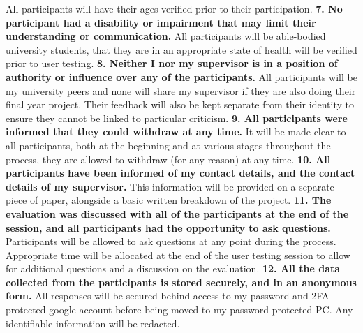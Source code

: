 \documentclass{report}
\begin{document}
\begin{raggedright}
\newline
\newline
All participants will have their ages verified prior to their participation.
\newline
\newline
\textbf{7. No participant had a disability or impairment that may limit their understanding
or communication.}
\newline
\newline
All participants will be able-bodied university students, that they are in an appropriate state of health will be verified prior to user testing.
\newline
\newline
\textbf{8. Neither I nor my supervisor is in a position of authority or influence over any of
the participants.}
\newline
\newline
All participants will be my university peers and none will share my supervisor if they are also doing their final year project. Their feedback will also be kept separate from their identity to ensure they cannot be linked to particular criticism.
\newline
\newline
\textbf{9. All participants were informed that they could withdraw at any time.}
\newline
\newline
It will be made clear to all participants, both at the beginning and at various stages throughout the process, they are allowed to withdraw (for any reason) at any time.
\newline
\newline
\textbf{10. All participants have been informed of my contact details, and the contact details
of my supervisor.}
\newline
\newline
This information will be provided on a separate piece of paper, alongside a basic written breakdown of the project.
\newline
\newline
\textbf{11. The evaluation was discussed with all of the participants at the end of the
session, and all participants had the opportunity to ask questions.}
\newline
\newline
Participants will be allowed to ask questions at any point during the process. Appropriate time will be allocated at the end of the user testing session to allow for additional questions and a discussion on the evaluation.
\newline
\newline
\textbf{12. All the data collected from the participants is stored securely, and in an
anonymous form.}
\newline
\newline
All responses will be secured behind access to my password and 2FA protected google account before being moved to my password protected PC. Any identifiable information will be redacted.
\end{raggedright}
\end{document}
